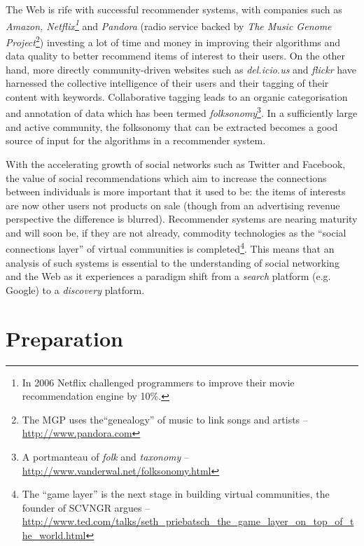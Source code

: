 \documentclass[a4paper,12pt,twoside,notitlepage,draft]{report}
\begin{document}
The Web is rife with successful recommender systems, with companies such as 
\textit{Amazon, Netflix\footnote{In 2006 Netflix challenged programmers to 
improve their movie recommendation engine by 10\%.}} and \textit{Pandora} 
(radio service backed by \textit{The Music Genome Project}\footnote{The MGP 
uses the``genealogy'' of music to link songs and artists -- 
\url{http://www.pandora.com}}) investing a lot of time and money in improving 
their algorithms and data quality to better recommend items of interest to 
their users. On the other hand, more directly community-driven websites such as 
\textit{del.icio.us} and \textit{flickr} have harnessed the collective 
intelligence of their users and their tagging of their content with keywords. 
Collaborative tagging leads to an organic categorisation and annotation of data 
which has been termed \textit{folksonomy}\footnote{A portmanteau of 
\textit{folk} and \textit{taxonomy} -- 
\url{http://www.vanderwal.net/folksonomy.html}}. In a sufficiently large and 
active community, the folksonomy that can be extracted becomes a good source of 
input for the algorithms in a recommender system. 

With the accelerating growth of social networks such as Twitter and Facebook, 
the value of social recommendations which aim to increase the connections 
between individuals is more important that it used to be: the items of 
interests are now other users not products on sale (though from an advertising 
revenue perspective the difference is blurred). Recommender systems are nearing 
maturity and will soon be, if they are not already, commodity technologies as 
the ``social connections layer'' of virtual communities is completed\footnote{
The ``game layer'' is the next stage in building virtual communities, the 
founder of SCVNGR argues -- \url{
http://www.ted.com/talks/seth_priebatsch_the_game_layer_on_top_of_the_world.html}}. 
This means that an analysis of such systems is essential to the understanding 
of social networking and the Web as it experiences a paradigm shift from a 
\emph{search} platform (e.g. Google) to a \emph{discovery} platform.


\chapter{Preparation}
\end{document}
